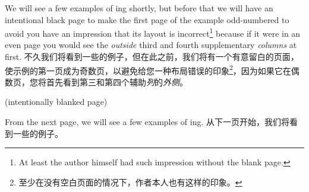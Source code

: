 \ifodd\value{page}
\begin{paracol}{2}
We will see a few examples of \parapag{}ing shortly, but before that we
will have an intentional black page to make the first page of the example
odd-numbered to avoid you have an impression that its layout is
incorrect\footnote{At least the author himself had such impression without the blank page.}
because if it were in an even page you would see the {\em outside\/} third
and fourth supplementary {\em columns\/} at first.
\switchcolumn
不久我们将看到一些\parapag{}的例子，但在此之前，我们将有一个有意留白的页面，使示例的第一页成为奇数页，以避免给您一种布局错误的印象\footnote{至少在没有空白页面的情况下，作者本人也有这样的印象。}，因为如果它在偶数页，您将首先看到第三和第四个辅助{\em 列}的{\em 外侧}。
\newpage\vspace*{\fill}\centerline{(intentionally blanked page)}\vfill
\end{paracol}

\else
{}
\begin{paracol}{2}
From the next page, we will see a few examples of \parapag{}ing.
\switchcolumn
从下一页开始，我们将看到一些\parapag{}的例子。
\end{paracol}

\fi
